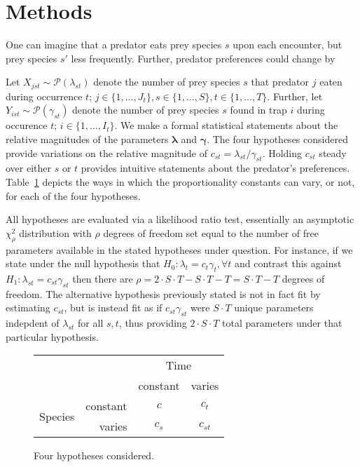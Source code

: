 \section*{Methods}

One can imagine that a predator eats prey species $s$ upon each encounter, but prey species $s'$ less frequently.  Further, predator preferences could change by 

Let $X_{jst} \sim \mathcal{P}(\lambda_{st})$ denote the number of prey species $s$ that predator $j$ eaten during occurrence $t$; $j \in \{1, \ldots, J_t\}, s \in \{1, \ldots, S\}, t \in \{1, \ldots, T\}$.  Further, let $Y_{ist} \sim \mathcal{P}(\gamma_{st})$ denote the number of prey species $s$ found in trap $i$ during occurence $t$; $i \in \{1, \ldots, I_t\}$.  We make a formal statistical statements about the relative magnitudes of the parameters $\boldsymbol{\lambda}$ and $\boldsymbol{\gamma}$.  The four hypotheses considered provide variations on the relative magnitude of $c_{st} = \lambda_{st}/\gamma_{st}$.  Holding $c_{st}$ steady over either $s$ or $t$ provides intuitive statements about the predator's preferences.  Table~\ref{tab:hyp} depicts the ways in which the proportionality constants can vary, or not, for each of the four hypotheses.  

All hypotheses are evaluated via a likelihood ratio test, essentially an asymptotic $\chi_{\rho}^2$ distribution with $\rho$ degrees of freedom set equal to the number of free parameters available in the stated hypotheses under question.  For instance, if we state under the null hypothesis that $H_0: \lambda_t = c_t \gamma_t, \forall t$ and contrast this against $H_1: \lambda_{st} = c_{st}\gamma_{st}$ then there are $\rho = 2 \cdot S \cdot T - S \cdot T - T = S \cdot T - T$ degrees of freedom.  The alternative hypothesis previously stated is not in fact fit by estimating $c_{st}$, but is instead fit as if $c_{st}\gamma_{st}$ were $S \cdot T$ unique parameters indepdent of $\lambda_{st}$ for all $s,t$, thus providing $2 \cdot S \cdot T$ total parameters under that particular hypothesis.  

\begin{figure}
  \centering
  \begin{tabular}{rrcc}
    & & \multicolumn{2}{c}{Time} \\
    & & constant & varies \\
    \cline{3-4}
    \multirow{2}{*}{Species} & \multicolumn{1}{r|}{constant} & \multicolumn{1}{c}{$c$} & \multicolumn{1}{|c|}{$c_t$} \\ 
    \cline{3-4}
    & \multicolumn{1}{r|}{varies} & \multicolumn{1}{c}{$c_s$} & \multicolumn{1}{|c|}{$c_{st}$} \\
    \cline{3-4}
  \end{tabular}
  \caption{Four hypotheses considered.}
  \label{tab:hyp}
\end{figure}

